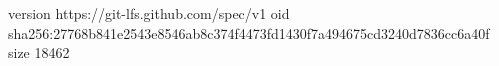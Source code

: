 version https://git-lfs.github.com/spec/v1
oid sha256:27768b841e2543e8546ab8c374f4473fd1430f7a494675cd3240d7836cc6a40f
size 18462
